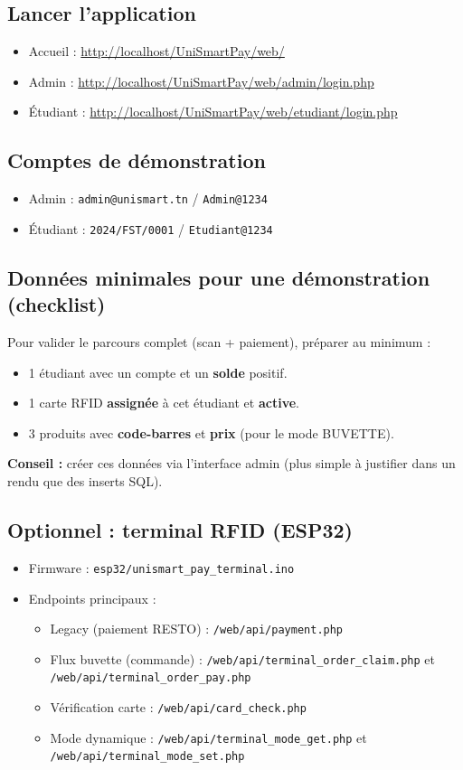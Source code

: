 \documentclass[11pt,a4paper]{article}
\begin{document}
\subsection{Lancer l’application}
\begin{itemize}
  \item Accueil : \url{http://localhost/UniSmartPay/web/}
  \item Admin : \url{http://localhost/UniSmartPay/web/admin/login.php}
  \item Étudiant : \url{http://localhost/UniSmartPay/web/etudiant/login.php}
\end{itemize}

\subsection{Comptes de démonstration}
\begin{itemize}
  \item Admin : \texttt{admin@unismart.tn} / \texttt{Admin@1234}
  \item Étudiant : \texttt{2024/FST/0001} / \texttt{Etudiant@1234}
\end{itemize}

\subsection{Données minimales pour une démonstration (checklist)}
Pour valider le parcours complet (scan + paiement), préparer au minimum :
\begin{itemize}
  \item 1 étudiant avec un compte et un \textbf{solde} positif.
  \item 1 carte RFID \textbf{assignée} à cet étudiant et \textbf{active}.
  \item 3 produits avec \textbf{code-barres} et \textbf{prix} (pour le mode BUVETTE).
\end{itemize}
\textbf{Conseil :} créer ces données via l’interface admin (plus simple à justifier dans un rendu que des inserts SQL).

\subsection{Optionnel : terminal RFID (ESP32)}
\begin{itemize}
  \item Firmware : \texttt{esp32/unismart_pay_terminal.ino}
  \item Endpoints principaux :
  \begin{itemize}
    \item Legacy (paiement RESTO) : \texttt{/web/api/payment.php}
    \item Flux buvette (commande) : \texttt{/web/api/terminal\_order\_claim.php} et \texttt{/web/api/terminal\_order\_pay.php}
    \item Vérification carte : \texttt{/web/api/card\_check.php}
    \item Mode dynamique : \texttt{/web/api/terminal\_mode\_get.php} et \texttt{/web/api/terminal\_mode\_set.php}
  \end{itemize}
\end{itemize}
\end{document}
